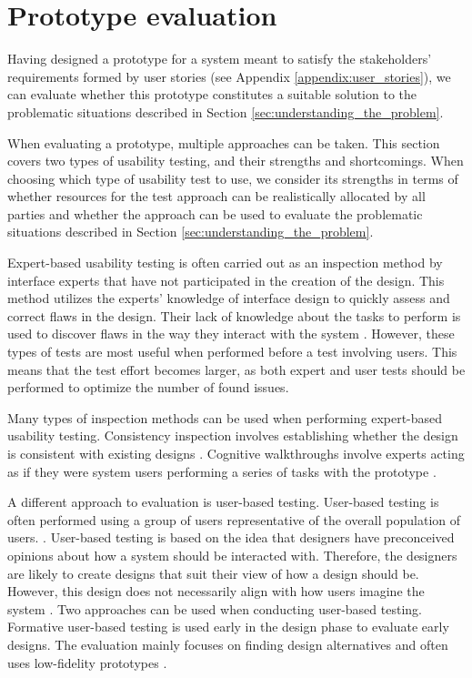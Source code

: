 \section{Prototype evaluation}\label{sec:prototype_evaluation}
Having designed a prototype for a system meant to satisfy the stakeholders' requirements formed by user stories (see Appendix \ref{appendix:user_stories}), we can evaluate whether this prototype constitutes a suitable solution to the problematic situations described in Section \ref{sec:understanding_the_problem}.

When evaluating a prototype, multiple approaches can be taken.
This section covers two types of usability testing, and their strengths and shortcomings.
When choosing which type of usability test to use, we consider its strengths in terms of whether resources for the test approach can be realistically allocated by all parties and whether the approach can be used to evaluate the problematic situations described in Section \ref{sec:understanding_the_problem}.

Expert-based usability testing is often carried out as an inspection method \cite{NJ_InspectionMethods} by interface experts that have not participated in the creation of the design.
This method utilizes the experts' knowledge of interface design to quickly assess and correct flaws in the design.
Their lack of knowledge about the tasks to perform is used to discover flaws in the way they interact with the system \cite{researchmethodsinhumancomputerinteraction}.
However, these types of tests are most useful when performed before a test involving users\cite{lazar2005web}. 
This means that the test effort becomes larger, as both expert and user tests should be performed to optimize the number of found issues. \cite{researchmethodsinhumancomputerinteraction} 

Many types of inspection methods can be used when performing expert-based usability testing.
Consistency inspection involves establishing whether the design is consistent with existing designs \cite{NJ_InspectionMethods,wixon_consistencyInspections}.  
Cognitive walkthroughs involve experts acting as if they were system users performing a series of tasks with the prototype \cite{Hollingsed_cognitive_walthrough}.

A different approach to evaluation is user-based testing.
User-based testing is often performed using a group of users representative of the overall population of users. \cite{researchmethodsinhumancomputerinteraction}.
User-based testing is based on the idea that designers have preconceived opinions about how a system should be interacted with. 
Therefore, the designers are likely to create designs that suit their view of how a design should be.
However, this design does not necessarily align with how users imagine the system \cite{user-centred-design,researchmethodsinhumancomputerinteraction}.
Two approaches can be used when conducting user-based testing. 
Formative user-based testing is used early in the design phase to evaluate early designs. 
The evaluation mainly focuses on finding design alternatives and often uses low-fidelity prototypes \cite{dumasAndFox_formative_usability_testing}.

